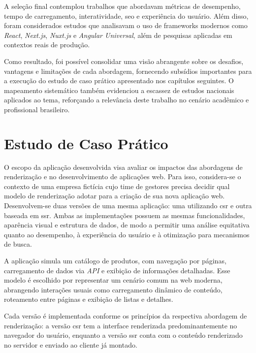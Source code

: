 A seleção final contemplou trabalhos que abordavam métricas de desempenho, tempo de carregamento, interatividade, \acrshort{seo} e experiência do usuário. Além disso, foram considerados estudos que analisavam o uso de frameworks modernos como \textit{React}, \textit{Next.js}, \textit{Nuxt.js} e \textit{Angular Universal}, além de pesquisas aplicadas em contextos reais de produção.

Como resultado, foi possível consolidar uma visão abrangente sobre os desafios, vantagens e limitações de cada abordagem, fornecendo subsídios importantes para a execução do estudo de caso prático apresentado nos capítulos seguintes. O mapeamento sistemático também evidenciou a escassez de estudos nacionais aplicados ao tema, reforçando a relevância deste trabalho no cenário acadêmico e profissional brasileiro.


\section{Estudo de Caso Prático}
\label{sec:estudo-de-caso-pratico}

O escopo da aplicação desenvolvida visa avaliar os impactos das abordagens de renderização  e  no desenvolvimento de aplicações web. Para isso, considera-se o contexto de uma empresa fictícia cujo time de gestores precisa decidir qual modelo de renderização adotar para a criação de sua nova aplicação web. Desenvolvem-se duas versões de uma mesma aplicação: uma utilizando \acrshort{csr} e outra baseada em \acrshort{ssr}. Ambas as implementações possuem as mesmas funcionalidades, aparência visual e estrutura de dados, de modo a permitir uma análise equitativa quanto ao desempenho, à experiência do usuário e à otimização para mecanismos de busca.

A aplicação simula um catálogo de produtos, com navegação por páginas, carregamento de dados via \textit{API} e exibição de informações detalhadas. Esse modelo é escolhido por representar um cenário comum na web moderna, abrangendo interações usuais como carregamento dinâmico de conteúdo, roteamento entre páginas e exibição de listas e detalhes.

Cada versão é implementada conforme os princípios da respectiva abordagem de renderização: a versão \acrshort{csr} tem a interface renderizada predominantemente no navegador do usuário, enquanto a versão \acrshort{ssr} conta com o conteúdo renderizado no servidor e enviado ao cliente já montado.

